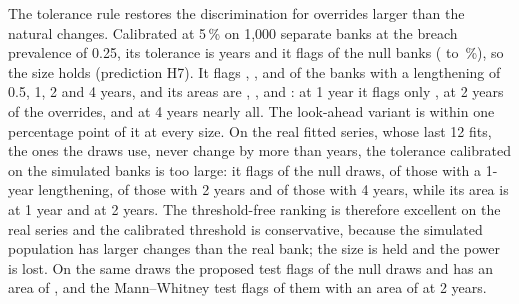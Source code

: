 The tolerance rule restores the discrimination for overrides larger than the natural changes. Calibrated at 5\,\% on 1,000 separate banks at the breach prevalence of 0.25, its tolerance is \deltaB{} years and it flags \fitNullTol{} of the null banks (\fitNullLoTol{} to \fitNullHiTol{}\,\%), so the size holds (prediction H7). It flags \fitAddATol{}, \fitAddBTol{}, \fitAddCTol{} and \fitAddDTol{} of the banks with a lengthening of 0.5, 1, 2 and 4 years, and its areas are \fitAucATol{}, \fitAucBTol{}, \fitAucCTol{} and \fitAucDTol{}: at 1 year it flags only \fitAddBTol{}, at 2 years \fitAddCTol{} of the overrides, and at 4 years nearly all. The look-ahead variant is within one percentage point of it at every size. On the real fitted series, whose last 12 fits, the ones the draws use, never change by more than \realMaxLast{} years, the tolerance calibrated on the simulated banks is too large: it flags \realTolNull{} of the null draws, \realTolAddB{} of those with a 1-year lengthening, \realTolAddC{} of those with 2 years and \realTolAddD{} of those with 4 years, while its area is \realTolAucB{} at 1 year and \realTolAucC{} at 2 years. The threshold-free ranking is therefore excellent on the real series and the calibrated threshold is conservative, because the simulated population has larger changes than the real bank; the size is held and the power is lost. On the same draws the proposed test flags \realEngineNull{} of the null draws and has an area of \realEngineAuc{}, and the Mann--Whitney test flags \realMwNull{} of them with an area of \realMwAucC{} at 2 years.


